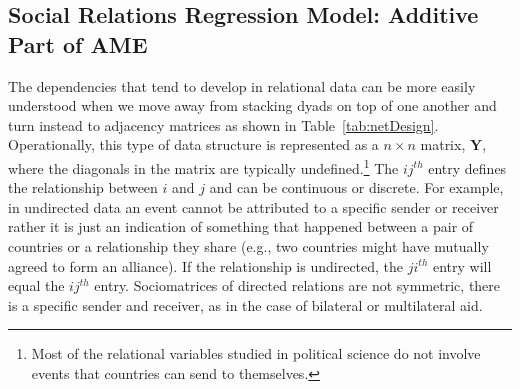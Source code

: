 \documentclass[12pt,onesided,pdflatex]{amsart}
\begin{document}
\subsection{Social Relations Regression Model: Additive Part of AME}

The dependencies that tend to develop in relational data can be more easily understood when we move away from stacking dyads on top of one another and turn instead to adjacency matrices as shown in Table~\ref{tab:netDesign}. Operationally, this type of data structure is represented as a $n \times n$ matrix, $\mathbf{Y}$, where the diagonals in the matrix are typically undefined.\footnote{Most of the relational variables studied in political science do not involve events that countries can send to themselves.} The $ij^{th}$ entry defines the relationship between $i$ and $j$ and can be continuous or discrete. For example, in undirected data an event cannot be attributed to a specific sender or receiver rather it is just an indication of something that happened between a pair of countries or a relationship they share (e.g., two countries might have mutually agreed to form an alliance). If the relationship is undirected, the $ji^{th}$ entry will equal the $ij^{th}$ entry. Sociomatrices of directed relations are not symmetric, there is a specific sender and receiver, as in the case of bilateral or multilateral aid.
\end{document}
